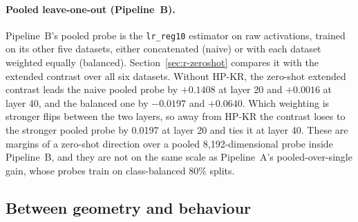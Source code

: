 \paragraph{Pooled leave-one-out (Pipeline~B).} Pipeline~B's pooled probe is the \texttt{lr\_reg10} estimator on raw activations, trained on its other five datasets, either concatenated (naive) or with each dataset weighted equally (balanced). %
Section~\ref{sec:r-zeroshot} compares it with the extended contrast over all six datasets.
Without HP-KR, the zero-shot extended contrast leads the naive pooled probe by $+0.1408$ at layer 20 and $+0.0016$ at layer 40, and the balanced one by $-0.0197$ and $+0.0640$. %
Which weighting is stronger flips between the two layers, so away from HP-KR the contrast loses to the stronger pooled probe by 0.0197 at layer 20 and ties it at layer 40. %
These are margins of a zero-shot direction over a pooled 8{,}192-dimensional probe inside Pipeline~B, and they are not on the same scale as Pipeline~A's pooled-over-single gain, whose probes train on class-balanced 80\% splits. %

\subsection{Between geometry and behaviour}
\label{sec:r-geometry}

